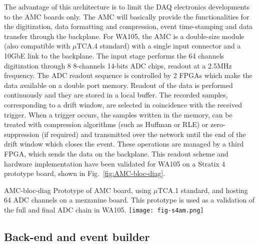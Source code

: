 The advantage of this architecture is to limit the DAQ electronics
developments to the AMC boards only. The AMC will basically provide
the functionalities for the digitization, data formatting and
compression, event time-stamping and data transfer through the
backplane. For WA105, the AMC is a double-size module (also compatible
with $\mu$TCA.4 standard) with a single input connector and a 10GbE
link to the backplane. The input stage performs the 64 channels
digitization through 8 8-channels 14-bits ADC chips, readout at a
2.5MHz frequency. The ADC readout sequence is controlled by 2 FPGAs
which make the data available on a double port memory. Readout of the
data is performed continuously and they are stored in a local
buffer. The recorded samples, corresponding to a drift window, are
selected in coincidence with the received trigger. When a trigger
occurs, the samples written in the memory, can be treated with
compression algorithms (such as Huffman or RLE) or zero-suppression
(if required) and transmitted over the network until the end of the
drift window which closes the event. These operations are managed by a
third FPGA, which sends the data on the backplane.  This readout
scheme and hardware implementation have been validated for WA105 on a
Stratix 4 prototype board, shown in Fig.~\ref{fig:AMC-bloc-diag}.
\begin{cdrfigure}{AMC-bloc-diag}
{\small Prototype of AMC board, using $\mu$TCA.1 standard, and hosting 
64 ADC channels on a mezzanine board. This prototype is used as a validation 
of the full and final ADC chain in WA105.}
\texttt{[image: fig-s4am.png]}
\end{cdrfigure}

\subsection{Back-end and event builder}


